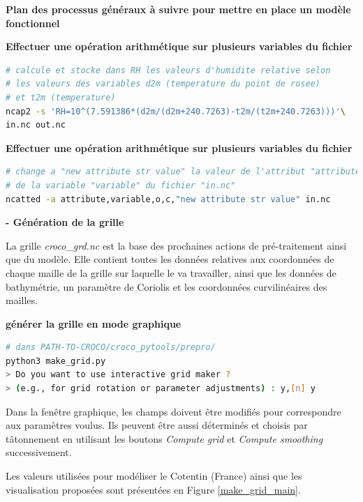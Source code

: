 \documentclass[10pt,a4paper,titlepage]{article}
\begin{document}
\begin{processEnv}{\textbf{Plan des processus généraux à suivre pour mettre en place un modèle fonctionnel}}
    \begin{codeEnv}{\textbf{Effectuer une opération arithmétique sur plusieurs variables du fichier}}
\begin{lstlisting}[language=bash]
# calcule et stocke dans RH les valeurs d'humidite relative selon
# les valeurs des variables d2m (temperature du point de rosee)
# et t2m (temperature)
ncap2 -s 'RH=10^(7.591386*(d2m/(d2m+240.7263)-t2m/(t2m+240.7263)))'\
in.nc out.nc
\end{lstlisting}
    \end{codeEnv}

    \begin{codeEnv}{\textbf{Effectuer une opération arithmétique sur plusieurs variables du fichier}}
\begin{lstlisting}[language=bash]
# change a "new attribute str value" la valeur de l'attribut "attribute"
# de la variable "variable" du fichier "in.nc"
ncatted -a attribute,variable,o,c,"new attribute str value" in.nc
\end{lstlisting}
    \end{codeEnv}

    \textbf{- Génération de la grille}

    La grille \textit{croco\_grd.nc} est la base des prochaines actions de pré-traitement ainsi que du modèle. Elle contient toutes les données relatives aux coordonnées de chaque maille de la grille sur laquelle le va travailler, ainsi que les données de bathymétrie, un paramètre de Coriolis et les coordonnées curvilinéaires des mailles.

    \begin{codeEnv}{\textbf{générer la grille en mode graphique}}
\begin{lstlisting}[language=bash]
# dans PATH-TO-CROCO/croco_pytools/prepro/
python3 make_grid.py
> Do you want to use interactive grid maker ?
> (e.g., for grid rotation or parameter adjustments) : y,[n] y
\end{lstlisting}
    \end{codeEnv}

    Dans la fenêtre graphique, les champs doivent être modifiés pour correspondre aux paramètres voulus. Ils peuvent être aussi déterminés et choisis par tâtonnement en utilisant les boutons \textit{Compute grid} et \textit{Compute smoothing} successivement.

    Les valeurs utilisées pour modéliser le Cotentin (France) ainsi que les visualisation proposées sont présentées en Figure \ref{make_grid_main}.


\end{processEnv}
\end{document}
